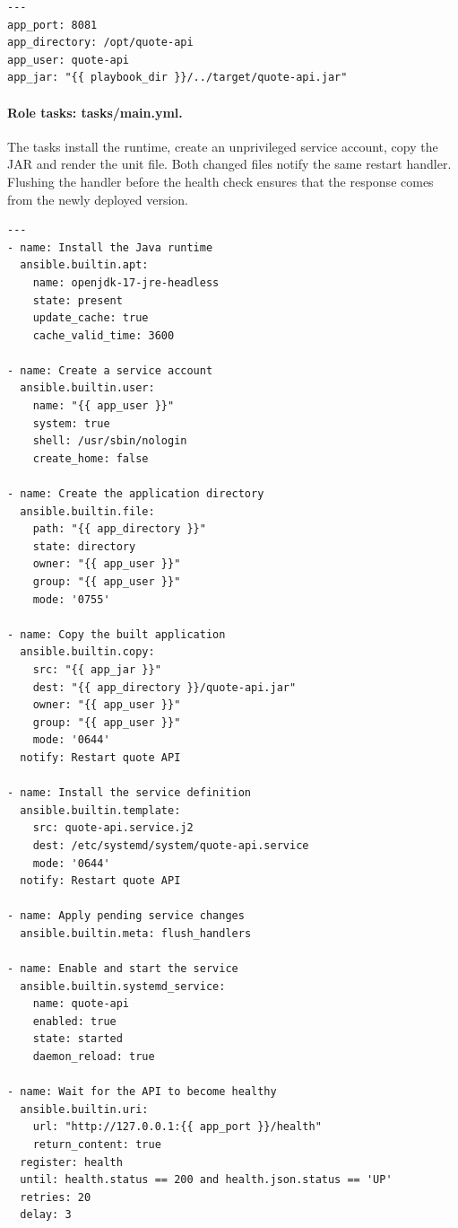\documentclass[12pt,a4paper]{article}
\begin{document}
\begin{lstlisting}[language={}]
---
app_port: 8081
app_directory: /opt/quote-api
app_user: quote-api
app_jar: "{{ playbook_dir }}/../target/quote-api.jar"
\end{lstlisting}


\paragraph{Role tasks: tasks/main.yml.}
The tasks install the runtime, create an unprivileged service account, copy the JAR and render the unit file. Both changed files notify the same restart handler. Flushing the handler before the health check ensures that the response comes from the newly deployed version.

\begin{lstlisting}[language={}]
---
- name: Install the Java runtime
  ansible.builtin.apt:
    name: openjdk-17-jre-headless
    state: present
    update_cache: true
    cache_valid_time: 3600

- name: Create a service account
  ansible.builtin.user:
    name: "{{ app_user }}"
    system: true
    shell: /usr/sbin/nologin
    create_home: false

- name: Create the application directory
  ansible.builtin.file:
    path: "{{ app_directory }}"
    state: directory
    owner: "{{ app_user }}"
    group: "{{ app_user }}"
    mode: '0755'

- name: Copy the built application
  ansible.builtin.copy:
    src: "{{ app_jar }}"
    dest: "{{ app_directory }}/quote-api.jar"
    owner: "{{ app_user }}"
    group: "{{ app_user }}"
    mode: '0644'
  notify: Restart quote API

- name: Install the service definition
  ansible.builtin.template:
    src: quote-api.service.j2
    dest: /etc/systemd/system/quote-api.service
    mode: '0644'
  notify: Restart quote API

- name: Apply pending service changes
  ansible.builtin.meta: flush_handlers

- name: Enable and start the service
  ansible.builtin.systemd_service:
    name: quote-api
    enabled: true
    state: started
    daemon_reload: true

- name: Wait for the API to become healthy
  ansible.builtin.uri:
    url: "http://127.0.0.1:{{ app_port }}/health"
    return_content: true
  register: health
  until: health.status == 200 and health.json.status == 'UP'
  retries: 20
  delay: 3
\end{lstlisting}
\end{document}
